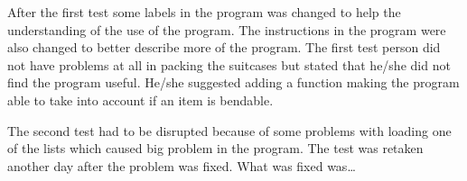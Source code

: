 After the first test some labels in the program was changed to help the understanding of the use of the program. The instructions in the program were also changed to better describe more of the program. The first test person did not have problems at all in packing the suitcases but stated that he/she did not find the program useful. He/she suggested adding a function making the program able to take into account if an item is bendable.

The second test had to be disrupted because of some problems with loading one of the lists which caused big problem in the program. The test was retaken another day after the problem was fixed. What was fixed was…  
